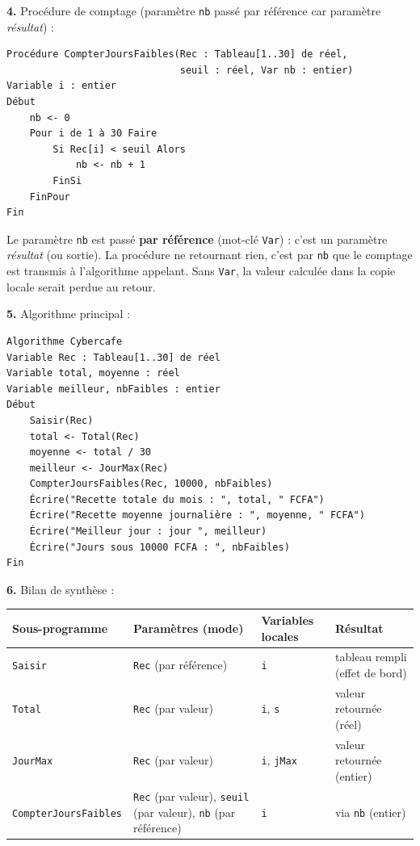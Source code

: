 \documentclass[11pt]{article}
\begin{document}
\begin{corrige}
\textbf{4.} Procédure de comptage (paramètre \texttt{nb} passé par référence car paramètre \emph{résultat}) :

\begin{lstlisting}
Procédure CompterJoursFaibles(Rec : Tableau[1..30] de réel,
                              seuil : réel, Var nb : entier)
Variable i : entier
Début
    nb <- 0
    Pour i de 1 à 30 Faire
        Si Rec[i] < seuil Alors
            nb <- nb + 1
        FinSi
    FinPour
Fin
\end{lstlisting}

Le paramètre \texttt{nb} est passé \textbf{par référence} (mot-clé \texttt{Var}) : c'est un paramètre \emph{résultat} (ou sortie). La procédure ne retournant rien, c'est par \texttt{nb} que le comptage est transmis à l'algorithme appelant. Sans \texttt{Var}, la valeur calculée dans la copie locale serait perdue au retour.

\textbf{5.} Algorithme principal :

\begin{lstlisting}
Algorithme Cybercafe
Variable Rec : Tableau[1..30] de réel
Variable total, moyenne : réel
Variable meilleur, nbFaibles : entier
Début
    Saisir(Rec)
    total <- Total(Rec)
    moyenne <- total / 30
    meilleur <- JourMax(Rec)
    CompterJoursFaibles(Rec, 10000, nbFaibles)
    Écrire("Recette totale du mois : ", total, " FCFA")
    Écrire("Recette moyenne journalière : ", moyenne, " FCFA")
    Écrire("Meilleur jour : jour ", meilleur)
    Écrire("Jours sous 10000 FCFA : ", nbFaibles)
Fin
\end{lstlisting}

\textbf{6.} Bilan de synthèse :

\begin{center}
\begin{tabularx}{\linewidth}{|l|X|X|X|}
\hline
\rowcolor{popblueL} \textbf{Sous-programme} & \textbf{Paramètres (mode)} & \textbf{Variables locales} & \textbf{Résultat} \\
\hline
\texttt{Saisir} & \texttt{Rec} (par référence) & \texttt{i} & tableau rempli (effet de bord) \\
\hline
\texttt{Total} & \texttt{Rec} (par valeur) & \texttt{i}, \texttt{s} & valeur retournée (réel) \\
\hline
\texttt{JourMax} & \texttt{Rec} (par valeur) & \texttt{i}, \texttt{jMax} & valeur retournée (entier) \\
\hline
\texttt{CompterJoursFaibles} & \texttt{Rec} (par valeur), \texttt{seuil} (par valeur), \texttt{nb} (par référence) & \texttt{i} & via \texttt{nb} (entier) \\
\hline
\end{tabularx}
\end{center}


\end{corrige}
\end{document}
